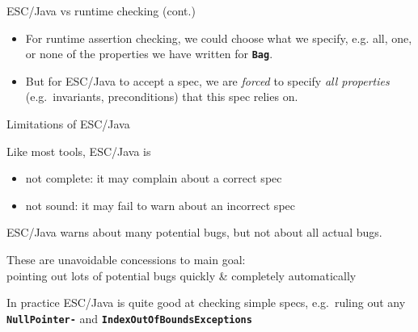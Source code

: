 \documentclass[
nocolorBG,
slideColor,
pdf,
erik,
]{prosper}
\newcommand{\code}[1]{{\rm \texttt{\textbf{\small #1}}}}
\begin{document}

\begin{slide}{ESC/Java vs runtime checking (cont.)}
\vspace*{-3ex}
\begin{itemize}
\item For {\green runtime assertion checking}, we could {\green choose
    what we specify}, e.g. all, one, or none of the properties we have
  written for \code{Bag}.
\item But for {\blue ESC/Java} to accept a spec, we are {\em {\blue
      forced}} to specify {\em {\blue all properties}} (e.g.\ 
  invariants, preconditions) that this spec relies on.
\end{itemize}
\end{slide}

\begin{slide}{Limitations of ESC/Java}
\vspace*{-3ex}

Like most tools, ESC/Java is
\begin{itemize}
\item {\blue not complete}: it may {\green complain about a correct spec}
\item {\blue not sound}: it may {\green fail to warn about an incorrect spec}
\end{itemize}
ESC/Java warns about {\green many potential bugs}, but {\green not
  about all actual bugs.}

\medskip

These are unavoidable concessions to main goal:\\
{\green pointing out lots of potential bugs quickly \& completely
  automatically}

\medskip

In practice ESC/Java is quite good at checking simple specs, e.g.\ 
ruling out any \code{NullPointer-} and
\code{IndexOutOfBounds\-Exceptions}

\end{slide}
\end{document}
